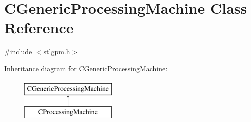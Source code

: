 \hypertarget{classCGenericProcessingMachine}{\section{C\-Generic\-Processing\-Machine Class Reference}
\label{classCGenericProcessingMachine}
}


{\ttfamily \#include $<$stlgpm.\-h$>$}

Inheritance diagram for C\-Generic\-Processing\-Machine\-:\begin{figure}[H]
\begin{center}
\leavevmode
\includegraphics[height=2.000000cm]{d8/dad/classCGenericProcessingMachine}
\end{center}
\end{figure}
